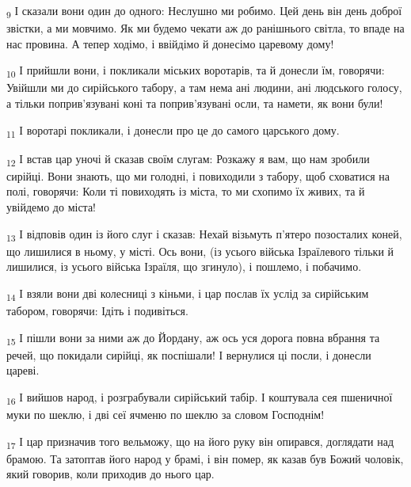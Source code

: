 \begin{tcolorbox}
\textsubscript{9} І сказали вони один до одного: Неслушно ми робимо. Цей день він день доброї звістки, а ми мовчимо. Як ми будемо чекати аж до ранішнього світла, то впаде на нас провина. А тепер ходімо, і ввійдімо й донесімо царевому дому!
\end{tcolorbox}
\begin{tcolorbox}
\textsubscript{10} І прийшли вони, і покликали міських воротарів, та й донесли їм, говорячи: Увійшли ми до сирійського табору, а там нема ані людини, ані людського голосу, а тільки поприв'язувані коні та поприв'язувані осли, та намети, як вони були!
\end{tcolorbox}
\begin{tcolorbox}
\textsubscript{11} І воротарі покликали, і донесли про це до самого царського дому.
\end{tcolorbox}
\begin{tcolorbox}
\textsubscript{12} І встав цар уночі й сказав своїм слугам: Розкажу я вам, що нам зробили сирійці. Вони знають, що ми голодні, і повиходили з табору, щоб сховатися на полі, говорячи: Коли ті повиходять із міста, то ми схопимо їх живих, та й увійдемо до міста!
\end{tcolorbox}
\begin{tcolorbox}
\textsubscript{13} І відповів один із його слуг і сказав: Нехай візьмуть п'ятеро позосталих коней, що лишилися в ньому, у місті. Ось вони, (із усього війська Ізраїлевого тільки й лишилися, із усього війська Ізраїля, що згинуло), і пошлемо, і побачимо.
\end{tcolorbox}
\begin{tcolorbox}
\textsubscript{14} І взяли вони дві колесниці з кіньми, і цар послав їх услід за сирійським табором, говорячи: Ідіть і подивіться.
\end{tcolorbox}
\begin{tcolorbox}
\textsubscript{15} І пішли вони за ними аж до Йордану, аж ось уся дорога повна вбрання та речей, що покидали сирійці, як поспішали! І вернулися ці посли, і донесли цареві.
\end{tcolorbox}
\begin{tcolorbox}
\textsubscript{16} І вийшов народ, і розграбували сирійський табір. І коштувала сея пшеничної муки по шеклю, і дві сеї ячменю по шеклю за словом Господнім!
\end{tcolorbox}
\begin{tcolorbox}
\textsubscript{17} І цар призначив того вельможу, що на його руку він опирався, доглядати над брамою. Та затоптав його народ у брамі, і він помер, як казав був Божий чоловік, який говорив, коли приходив до нього цар.
\end{tcolorbox}
